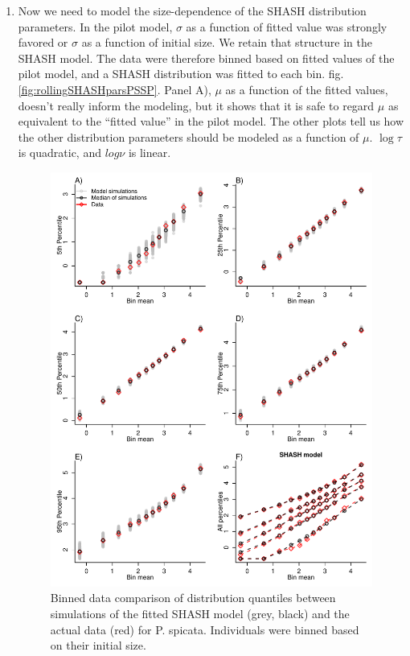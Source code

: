 \documentclass[11pt]{article}
\begin{document}
{\begin{enumerate}
\item Now we need to model the size-dependence of the SHASH distribution parameters. In the pilot model, $\sigma$ as a function
of fitted value was strongly favored or $\sigma$ as a function of initial size. We retain that structure in the SHASH model. 
The data were therefore binned based on fitted values of the pilot model, and a SHASH distribution was fitted to each bin. 
fig. \ref{fig:rollingSHASHparsPSSP}. Panel A), $\mu$ as a function of the fitted values, doesn't really inform the 
modeling, but it shows that it is safe to regard $\mu$ as equivalent to the ``fitted value'' in the pilot model. 
The other plots tell us how the other distribution parameters should be modeled as a function of $\mu$. $\log \tau$ is quadratic,
and $log \nu$ is linear. 
 

\begin{figure}[tbp]
\centering
\includegraphics[width=.9\textwidth]{figures/QuantileComparePlotPSSP.pdf}
\caption{Binned data comparison of distribution quantiles between simulations of the fitted SHASH model (grey, black) and the actual data (red) for 
{P. spicata}. Individuals were binned based on their initial size. }
\label{fig:BinnedConditionalQuantiles}
\end{figure} 



\end{enumerate}}
\end{document}

